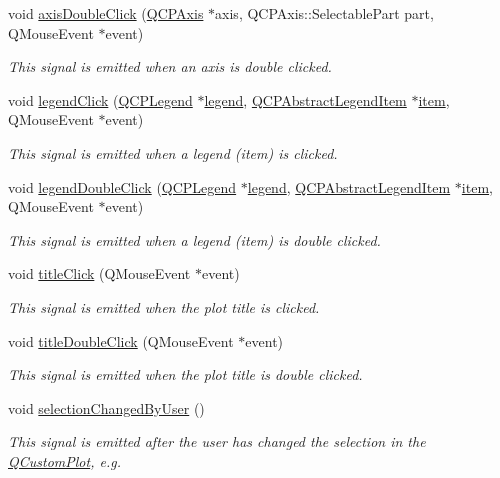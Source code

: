 \begin{DoxyCompactItemize}
void \hyperlink{a00116_a6df35357460181a72da3e93d600f5256}{axis\+Double\+Click} (\hyperlink{a00025}{Q\+C\+P\+Axis} $\ast$axis, Q\+C\+P\+Axis\+::\+Selectable\+Part part, Q\+Mouse\+Event $\ast$event)
\begin{DoxyCompactList}\small\item\em This signal is emitted when an axis is double clicked. \end{DoxyCompactList}\item 
void \hyperlink{a00116_a79cff0baafbca10a3aaf694d2d3b9ab3}{legend\+Click} (\hyperlink{a00045}{Q\+C\+P\+Legend} $\ast$\hyperlink{a00116_a75acd427ec48e9a9d2ae6a17817cc490}{legend}, \hyperlink{a00023}{Q\+C\+P\+Abstract\+Legend\+Item} $\ast$\hyperlink{a00116_a1138cb2d142c23006e7901494e256774}{item}, Q\+Mouse\+Event $\ast$event)
\begin{DoxyCompactList}\small\item\em This signal is emitted when a legend (item) is clicked. \end{DoxyCompactList}\item 
void \hyperlink{a00116_a0250f835c044521df1619b132288bca7}{legend\+Double\+Click} (\hyperlink{a00045}{Q\+C\+P\+Legend} $\ast$\hyperlink{a00116_a75acd427ec48e9a9d2ae6a17817cc490}{legend}, \hyperlink{a00023}{Q\+C\+P\+Abstract\+Legend\+Item} $\ast$\hyperlink{a00116_a1138cb2d142c23006e7901494e256774}{item}, Q\+Mouse\+Event $\ast$event)
\begin{DoxyCompactList}\small\item\em This signal is emitted when a legend (item) is double clicked. \end{DoxyCompactList}\item 
void \hyperlink{a00116_a969beb5e4b7e8864e5e349fcda4ce45b}{title\+Click} (Q\+Mouse\+Event $\ast$event)
\begin{DoxyCompactList}\small\item\em This signal is emitted when the plot title is clicked. \end{DoxyCompactList}\item 
void \hyperlink{a00116_a854db02b12e8df49b5f998f17e8ee770}{title\+Double\+Click} (Q\+Mouse\+Event $\ast$event)
\begin{DoxyCompactList}\small\item\em This signal is emitted when the plot title is double clicked. \end{DoxyCompactList}\item 
void \hyperlink{a00116_a500c64a109bc773c973ad274f2fa4190}{selection\+Changed\+By\+User} ()
\begin{DoxyCompactList}\small\item\em This signal is emitted after the user has changed the selection in the \hyperlink{a00030_d8/d00/a00186}{Q\+Custom\+Plot}, e.\+g. \end{DoxyCompactList}\item 

\end{DoxyCompactItemize}
